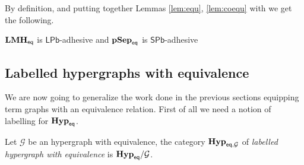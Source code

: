 \documentclass[3p]{elsarticle}
\newcommand{\pbl}{\mathsf{LPb}}
\newcommand{\pbs}{\mathsf{SPb}}
\newcommand{\catname}[1]{\textbf{\textup{#1}}}
\newcommand{\EqHyp}{\catname{Hyp}_{\mathsf{eq}}} %
\newcommand{\EqpsHyp}{\catname{pSep}_{\mathsf{eq}}}
\newcommand{\Eqlmo}{\catname{LMH}_{\mathsf{eq}}}
\newcommand{\EqHyps}{\catname{Hyp}_{\mathsf{eq}, \mathcal{G}}}
\theoremstyle{remark}
\theoremstyle{definition}
\begin{document}
By definition,  and putting together Lemmas \ref{lem:equ}, \ref{lem:coequ} with  we get the following.

\begin{cor}$\Eqlmo$ is $\pbl$-adhesive and $\EqpsHyp$ is $\pbs$-adhesive
\end{cor}



\subsection{Labelled hypergraphs with equivalence}

We are now going to generalize the work done in the previous sections equipping term graphs with an equivalence relation. First of all we need a notion of labelling for $\EqHyp$. 

\begin{defi}
	Let $\mathcal{G}$ be an hypergraph with equivalence, the category $\EqHyps$ of \emph{labelled hypergraph with equivalence}  is $\EqHyp/\mathcal{G}$.
\end{defi}
\end{document}
